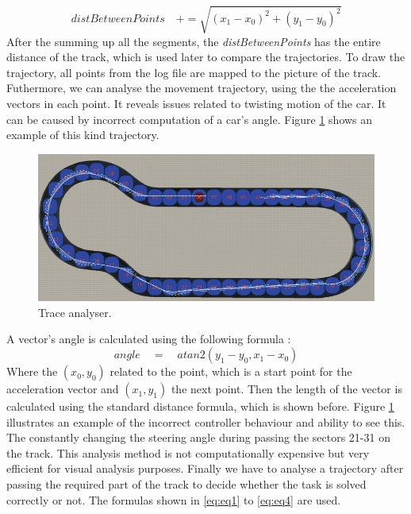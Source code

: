\begin{equation}
    distBetweenPoints\quad+= \sqrt{(x_1-x_0)^2 + (y_1-y_0)^2}
\end{equation}
After the summing up all the segments, the \textit{distBetweenPoints} has the entire distance of the track, which is used later to compare the trajectories. To draw the trajectory, all points from the log file are mapped to the picture of the track.\newline
Futhermore, we can analyse the movement trajectory, using the the acceleration vectors in each point. It reveals issues related to twisting motion of the car. It can be caused by incorrect computation of a car's angle. Figure \ref{fig:trajectory-acc} shows an example of this kind trajectory.\newline
\begin{figure}[h!]
    \centering
    \includegraphics[width=\linewidth]{src/pic/trajectory-acceleration}
    \caption{Trace analyser.}
    \label{fig:trajectory-acc}
\end{figure}\newline
A vector's angle is calculated using the following formula \cite{Atan2}:
\begin{equation}
    angle\quad=\quad atan2(y_1 - y_0, x_1 -x_0) 
\end{equation}
Where the $(x_0, y_0)$ related to the point, which is a start point for the acceleration vector and $(x_1, y_1)$ the next point. Then the length of the vector is calculated using the standard distance formula, which is shown before. Figure \ref{fig:trajectory-acc} illustrates an example of the incorrect controller behaviour and ability to see this. The constantly changing the steering angle during passing the sectors 21-31 on the track. This analysis method is not computationally expensive but very efficient for visual analysis purposes.\newline
Finally we have to analyse a trajectory after passing the required part of the track to decide whether the task is solved correctly or not. The formulas shown in \ref{eq:eq1} to \ref{eq:eq4} are used.
